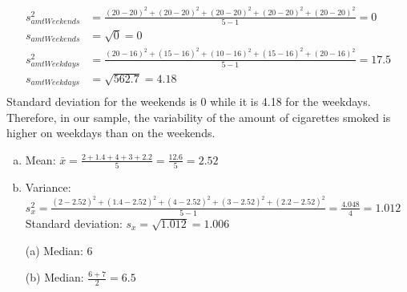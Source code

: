 %

{\begin{align*}
s^2_{amtWeekends} &= \frac{(20 - 20)^2 + (20 - 20)^2 + (20 - 20)^2 + (20 - 20)^2 + (20 - 20)^2}{5 - 1}  = 0 \\
s_{amtWeekends} &= \sqrt{0} = 0 \\
s^2_{amtWeekdays} &= \frac{(20 - 16)^2 + (15 - 16)^2 + (10 - 16)^2 + (15 - 16)^2 + (20 - 16)^2}{5 - 1} = 17.5 \\
s_{amtWeekdays} &= \sqrt{562.7} = 4.18 \\
\end{align*}
Standard deviation for the weekends is 0 while it is 4.18 for the weekdays. Therefore, in our sample, the variability of the amount of cigarettes smoked is higher on weekdays than on the weekends.
}

%

{
\begin{enumerate}[(a)]
\item Mean: $ \bar{x} = \frac{2 + 1.4 + 4 + 3 + 2.2}{5} = \frac{12.6}{5} = 2.52 $
\item Variance: $ s_x^2 =\frac{(2 - 2.52)^2+ (1.4 - 2.52)^2 + (4 - 2.52)^2 + (3 - 2.52)^2 + (2.2 - 2.52)^2}{5 - 1} = \frac{4.048}{4} = 1.012 $ \\
Standard deviation: $s_x = \sqrt{1.012} = 1.006 $
\end{enumerate}
}

%

{
\begin{enumerate}
\item[(a)] Median: 6
\item[(b)] Median: $\frac{6+7}{2} = 6.5$
\end{enumerate}
}

